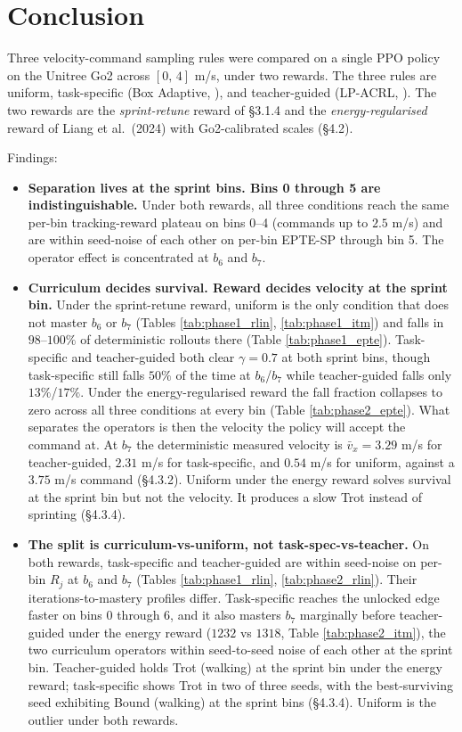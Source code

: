 \section{Conclusion}

Three velocity-command sampling rules were compared on a single PPO policy on the Unitree Go2 across $[0,\,4]$ m/s, under two rewards. The three rules are uniform, task-specific (Box Adaptive, \cite{margolis2022}), and teacher-guided (LP-ACRL, \cite{li2026}). The two rewards are the \textit{sprint-retune} reward of \S3.1.4 and the \textit{energy-regularised} reward of Liang et al.\ (2024) with Go2-calibrated scales (\S4.2).

Findings:

\begin{itemize}
  \item \textbf{Separation lives at the sprint bins. Bins 0 through 5 are indistinguishable.} Under both rewards, all three conditions reach the same per-bin tracking-reward plateau on bins 0--4 (commands up to $2.5$ m/s) and are within seed-noise of each other on per-bin EPTE-SP through bin 5. The operator effect is concentrated at $b_6$ and $b_7$.

  \item \textbf{Curriculum decides survival. Reward decides velocity at the sprint bin.} Under the sprint-retune reward, uniform is the only condition that does not master $b_6$ or $b_7$ (Tables \ref{tab:phase1_rlin}, \ref{tab:phase1_itm}) and falls in $98$--$100\%$ of deterministic rollouts there (Table \ref{tab:phase1_epte}). Task-specific and teacher-guided both clear $\gamma = 0.7$ at both sprint bins, though task-specific still falls $50\%$ of the time at $b_6$/$b_7$ while teacher-guided falls only $13\%$/$17\%$. Under the energy-regularised reward the fall fraction collapses to zero across all three conditions at every bin (Table \ref{tab:phase2_epte}). What separates the operators is then the velocity the policy will accept the command at. At $b_7$ the deterministic measured velocity is $\bar v_x = 3.29$ m/s for teacher-guided, $2.31$ m/s for task-specific, and $0.54$ m/s for uniform, against a $3.75$ m/s command (\S4.3.2). Uniform under the energy reward solves survival at the sprint bin but not the velocity. It produces a slow Trot instead of sprinting (\S4.3.4).

  \item \textbf{The split is curriculum-vs-uniform, not task-spec-vs-teacher.} On both rewards, task-specific and teacher-guided are within seed-noise on per-bin $R_j$ at $b_6$ and $b_7$ (Tables \ref{tab:phase1_rlin}, \ref{tab:phase2_rlin}). Their iterations-to-mastery profiles differ. Task-specific reaches the unlocked edge faster on bins 0 through 6, and it also masters $b_7$ marginally before teacher-guided under the energy reward ($1232$ vs $1318$, Table \ref{tab:phase2_itm}), the two curriculum operators within seed-to-seed noise of each other at the sprint bin. Teacher-guided holds Trot (walking) at the sprint bin under the energy reward; task-specific shows Trot in two of three seeds, with the best-surviving seed exhibiting Bound (walking) at the sprint bins (\S4.3.4). Uniform is the outlier under both rewards.


\end{itemize}
